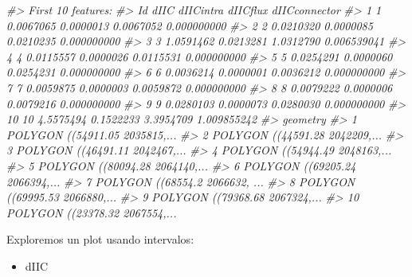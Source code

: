 \documentclass[
]{book}
\newenvironment{Shaded}{\begin{snugshade}}{\end{snugshade}}
\newcommand{\CommentTok}[1]{\textcolor[rgb]{0.56,0.35,0.01}{\textit{#1}}}
\providecommand{\tightlist}{%
  \setlength{\itemsep}{0pt}\setlength{\parskip}{0pt}}
\begin{document}
\begin{Shaded}
\begin{Highlighting}[]
\CommentTok{\#\textgreater{} First 10 features:}
\CommentTok{\#\textgreater{}    Id      dIIC dIICintra  dIICflux dIICconnector}
\CommentTok{\#\textgreater{} 1   1 0.0067065 0.0000013 0.0067052   0.000000000}
\CommentTok{\#\textgreater{} 2   2 0.0210320 0.0000085 0.0210235   0.000000000}
\CommentTok{\#\textgreater{} 3   3 1.0591462 0.0213281 1.0312790   0.006539041}
\CommentTok{\#\textgreater{} 4   4 0.0115557 0.0000026 0.0115531   0.000000000}
\CommentTok{\#\textgreater{} 5   5 0.0254291 0.0000060 0.0254231   0.000000000}
\CommentTok{\#\textgreater{} 6   6 0.0036214 0.0000001 0.0036212   0.000000000}
\CommentTok{\#\textgreater{} 7   7 0.0059875 0.0000003 0.0059872   0.000000000}
\CommentTok{\#\textgreater{} 8   8 0.0079222 0.0000006 0.0079216   0.000000000}
\CommentTok{\#\textgreater{} 9   9 0.0280103 0.0000073 0.0280030   0.000000000}
\CommentTok{\#\textgreater{} 10 10 4.5575494 0.1522233 3.3954709   1.009855242}
\CommentTok{\#\textgreater{}                          geometry}
\CommentTok{\#\textgreater{} 1  POLYGON ((54911.05 2035815,...}
\CommentTok{\#\textgreater{} 2  POLYGON ((44591.28 2042209,...}
\CommentTok{\#\textgreater{} 3  POLYGON ((46491.11 2042467,...}
\CommentTok{\#\textgreater{} 4  POLYGON ((54944.49 2048163,...}
\CommentTok{\#\textgreater{} 5  POLYGON ((80094.28 2064140,...}
\CommentTok{\#\textgreater{} 6  POLYGON ((69205.24 2066394,...}
\CommentTok{\#\textgreater{} 7  POLYGON ((68554.2 2066632, ...}
\CommentTok{\#\textgreater{} 8  POLYGON ((69995.53 2066880,...}
\CommentTok{\#\textgreater{} 9  POLYGON ((79368.68 2067324,...}
\CommentTok{\#\textgreater{} 10 POLYGON ((23378.32 2067554,...}
\end{Highlighting}
\end{Shaded}

Exploremos un plot usando intervalos:

\begin{itemize}
\tightlist
\item
  dIIC
\end{itemize}
\end{document}
